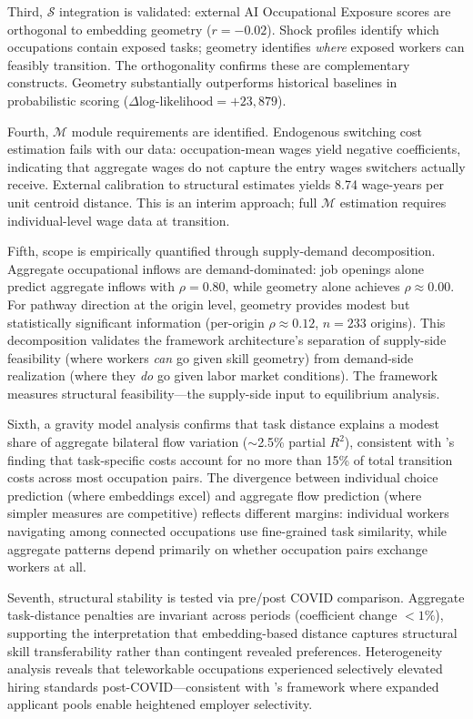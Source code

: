 \documentclass[12pt]{article}
\begin{document}
Third, $\mathcal{S}$ integration is validated: external AI Occupational Exposure scores \citep{FeltenRajSeamans2021} are orthogonal to embedding geometry ($r = -0.02$). Shock profiles identify which occupations contain exposed tasks; geometry identifies \emph{where} exposed workers can feasibly transition. The orthogonality confirms these are complementary constructs. Geometry substantially outperforms historical baselines in probabilistic scoring ($\Delta \text{log-likelihood} = +23{,}879$).

Fourth, $\mathcal{M}$ module requirements are identified. Endogenous switching cost estimation fails with our data: occupation-mean wages yield negative coefficients, indicating that aggregate wages do not capture the entry wages switchers actually receive. External calibration to structural estimates \citep{DixCarneiro2014} yields 8.74 wage-years per unit centroid distance. This is an interim approach; full $\mathcal{M}$ estimation requires individual-level wage data at transition.

Fifth, scope is empirically quantified through supply-demand decomposition. Aggregate occupational inflows are demand-dominated: job openings alone predict aggregate inflows with $\rho = 0.80$, while geometry alone achieves $\rho \approx 0.00$. For pathway direction at the origin level, geometry provides modest but statistically significant information (per-origin $\rho \approx 0.12$, $n = 233$ origins). This decomposition validates the framework architecture's separation of supply-side feasibility (where workers \emph{can} go given skill geometry) from demand-side realization (where they \emph{do} go given labor market conditions). The framework measures structural feasibility---the supply-side input to equilibrium analysis.

Sixth, a gravity model analysis confirms that task distance explains a modest share of aggregate bilateral flow variation ($\sim$2.5\% partial $R^2$), consistent with \citet{CortesGallipoli2018}'s finding that task-specific costs account for no more than 15\% of total transition costs across most occupation pairs. The divergence between individual choice prediction (where embeddings excel) and aggregate flow prediction (where simpler measures are competitive) reflects different margins: individual workers navigating among connected occupations use fine-grained task similarity, while aggregate patterns depend primarily on whether occupation pairs exchange workers at all.

Seventh, structural stability is tested via pre/post COVID comparison. Aggregate task-distance penalties are invariant across periods (coefficient change $< 1\%$), supporting the interpretation that embedding-based distance captures structural skill transferability rather than contingent revealed preferences. Heterogeneity analysis reveals that teleworkable occupations experienced selectively elevated hiring standards post-COVID---consistent with \citet{ModestinoShoagBallance2020}'s framework where expanded applicant pools enable heightened employer selectivity.
\end{document}
